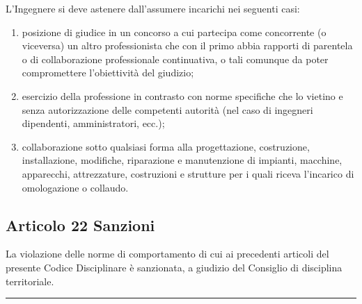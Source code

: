 \documentclass[letterpaper,10pt,italian]{sphinxmanual}
\begin{document}
\begin{description}
\sphinxAtStartPar
L’Ingegnere si deve astenere dall’assumere incarichi nei seguenti casi:
\begin{enumerate}
%
\item {} 
\sphinxAtStartPar
posizione di giudice in un concorso a cui partecipa come concorrente (o viceversa) un altro professionista che con il primo abbia rapporti di parentela o di collaborazione professionale continuativa, o tali comunque da poter compromettere l’obiettività del giudizio;

\item {} 
\sphinxAtStartPar
esercizio della professione in contrasto con norme specifiche che lo vietino e senza autorizzazione delle competenti autorità (nel caso di ingegneri dipendenti, amministratori, ecc.);

\item {} 
\sphinxAtStartPar
collaborazione sotto qualsiasi forma alla progettazione, costruzione, installazione, modifiche, riparazione e manutenzione di impianti, macchine, apparecchi, attrezzature, costruzioni e strutture per i quali riceva l’incarico di omologazione o collaudo.

\end{enumerate}

\end{description}


\subsection{Articolo 22 \sphinxhyphen{} Sanzioni}
\label{\detokenize{capitoli/codice/codice_deontologico:articolo-22-sanzioni}}\begin{description}
\sphinxAtStartPar
La violazione delle norme di comportamento di cui ai precedenti articoli del presente Codice Disciplinare è sanzionata, a giudizio del Consiglio di disciplina territoriale.

\end{description}


\bigskip\hrule\bigskip



\section{}
\label{\detokenize{capitoli/codice/codice_deontologico:capo-vii-disposizioni-finali}}
\end{document}
